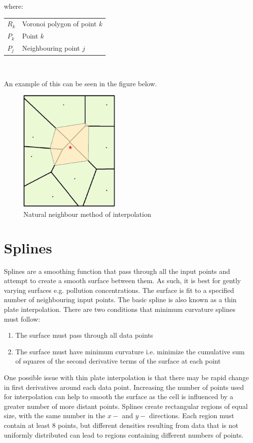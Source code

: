 \documentclass{article}
\makeatletter
\newenvironment{conditions}[1][where:] 
  {#1 \begin{tabular}[t]{>{$}l<{$} @{${}={}$} l}}
  {\end{tabular}\\[\belowdisplayskip]}
\makeatother
\begin{document}
\begin{conditions}
    R_{k} & Voronoi polygon of point $k$ \\
    P_{k} & Point $k$ \\ 
    P_{j} & Neighbouring point $j$
\end{conditions}

An example of this can be seen in the figure below.

\begin{figure}[h]
    \centering
    \caption{Natural neighbour method of interpolation}
    \label{Natural neighbour method of interpolation}
    \includegraphics[width=5cm]{natural-neighbour.png}
\end{figure}

\section{Splines}

Splines are a smoothing function that pass through all the input points and attempt to create a smooth surface between them.
As such, it is best for gently varying surfaces e.g. pollution concentrations.
The surface is fit to a specified number of neighbouring input points.
The basic spline is also known as a thin plate interpolation.
There are two conditions that minimum curvature splines must follow:

\begin{enumerate}
    \item The surface must pass through all data points
    \item The surface must have minimum curvature i.e. minimize the cumulative sum of squares of the second derivative terms of the surface at each point
\end{enumerate}

One possible issue with thin plate interpolation is that there may be rapid change in first derivatives around each data point.
Increasing the number of points used for interpolation can help to smooth the surface as the cell is influenced by a greater number of more distant points.
Splines create rectangular regions of equal size, with the same number in the $x-$ and $y-$ directions.
Each region must contain at least 8 points, but different densities resulting from data that is not uniformly distributed can lead to regions containing different numbers of points.
\end{document}
